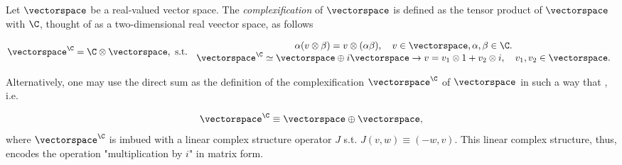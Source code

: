 \documentclass{homework}
\begin{document}
\begin{df}
    \textnormal{Let $\vectorspace$ be a real-valued vector space. The \textit{complexification} of $\vectorspace$ is defined as the tensor product of $\vectorspace$ with $\C$, thought of as a two-dimensional real veector space, as follows}
        
        \begin{equation*}
            \vectorspace^{\C} = \C \otimes \vectorspace, \textnormal{ s.t. } \begin{array}{cc}
                 \alpha(v \otimes \beta) = v \otimes (\alpha \beta), \quad v \in \vectorspace, \alpha, \beta \in \C. \\
                 \vectorspace^{\C} \simeq \vectorspace \oplus i \vectorspace \rightarrow v = v_1 \otimes 1 + v_2 \otimes i, \quad v_1, v_2 \in \vectorspace.
            \end{array}
        \end{equation*}
    
    \textnormal{Alternatively, one may use the direct sum as the definition of the complexification $\vectorspace^\C$ of $\vectorspace$ in such a way that , i.e.}
    
    $$
        \vectorspace^\C \equiv \vectorspace \oplus \vectorspace,
    $$    
    \textnormal{ where $\vectorspace^\C$ is imbued with a linear complex structure operator $J$ s.t. 
    $J(v,w) \equiv (-w, v)$. This linear complex structure, thus, encodes the operation "multiplication by $i$" in matrix form. 
    }
\end{df}
\end{document}
